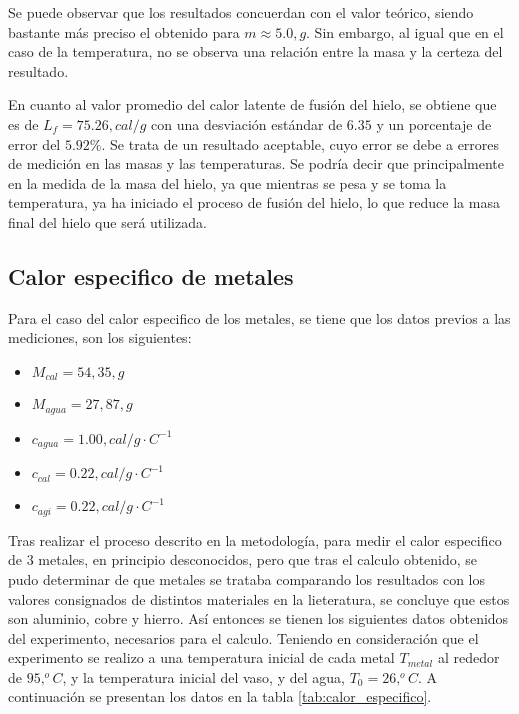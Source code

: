 \documentclass[10pt]{article}
\begin{document}
\begin{multicols*}{2}
    Se puede observar que los resultados concuerdan con el valor teórico, siendo
    bastante más preciso el obtenido para $m \approx 5.0 , g$. Sin embargo, al
    igual que en el caso de la temperatura, no se observa una relación entre la
    masa y la certeza del resultado.

    En cuanto al valor promedio del calor latente de fusión del hielo, se obtiene
    que es de $L_f = 75.26 , cal / g$ con una desviación estándar de $6.35$ y un
    porcentaje de error del $5.92 \%$. Se trata de un resultado aceptable, cuyo
    error se debe a errores de medición en las masas y las temperaturas. Se podría
    decir que principalmente en la medida de la masa del hielo, ya que mientras se
    pesa y se toma la temperatura, ya ha iniciado el proceso de fusión del hielo,
    lo que reduce la masa final del hielo que será utilizada.
    \subsection*{\small Calor especifico de metales}

    Para el caso del calor especifico de los metales, se tiene que los datos
    previos a las mediciones, son los siguientes:

    \begin{itemize}
        \item $M_{cal} = 54,35 , g$
        \item $M_{agua} = 27,87 , g$
        \item $c_{agua} = 1.00 , cal/g \cdot C^{-1}$
        \item $c_{cal} = 0.22 , cal/g \cdot C^{-1}$
        \item $c_{agi} = 0.22 , cal/g \cdot C^{-1}$
    \end{itemize}

    Tras realizar el proceso descrito en la metodología, para medir el calor
    especifico de 3 metales, en principio desconocidos, pero que tras el calculo
    obtenido, se pudo determinar de que metales se trataba comparando los
    resultados con los valores consignados de distintos materiales en la
    lieteratura, se concluye que estos son aluminio, cobre y hierro. Así entonces
    se tienen los siguientes datos obtenidos del experimento, necesarios para el
    calculo. Teniendo en consideración que el experimento se realizo a una
    temperatura inicial de cada metal $T_{metal}$ al rededor de $95 , ^oC$, y la
    temperatura inicial del vaso, y del agua, $T_{0} = 26 , ^oC$. A continuación se
    presentan los datos en la tabla \ref{tab:calor_especifico}.


\end{multicols*}
\end{document}

